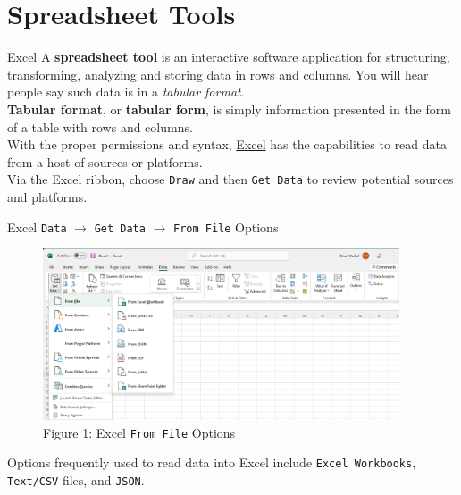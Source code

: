 \documentclass[pdf]{beamer}
\newcommand{\empr}[1]{{\color{franklinblue}\textbf{#1}}}
\theoremstyle{remark}
\theoremstyle{definition}
\begin{document}
\section{Spreadsheet Tools}

\begin{frame}[t]{Excel}
A \empr{spreadsheet tool} is an interactive software application for structuring, transforming, analyzing and storing data in rows and columns.  You will hear people say such data is in a \textit{tabular format}.
 \\
 \vspace{1.5ex}
\empr{Tabular format}, or  \empr{tabular form}, is simply information presented in the form of a table with rows and columns. \\
\vspace{1.5ex}
With the proper permissions and syntax, \href{https://www.microsoft.com/en-us/microsoft-365/excel}{Excel} has the capabilities to read data from a host of sources or platforms. \\
\vspace{1.5ex}
Via the Excel ribbon, choose \texttt{Draw} and then \texttt{Get Data} to review potential sources and platforms.  
\end{frame}

\begin{frame}[t]{Excel \texttt{Data} $\rightarrow$ \texttt{Get Data} $\rightarrow$ \texttt{From File} Options}
\begin{figure}[htbp]
  \captionsetup{justification=centering}
  \includegraphics[height=2in, trim=0.0cm 0.0cm 0.0cm 0.0cm width=6in]{Images/Excel_1.png}
  \caption{Figure {\color{franklinblue} 1}: Excel \texttt{From File} Options}
\end{figure}
\vspace{-1.5ex}
Options frequently used to read data into Excel include \texttt{Excel Workbooks}, \texttt{Text/CSV} files, and \texttt{JSON}.
\end{frame}
\end{document}
